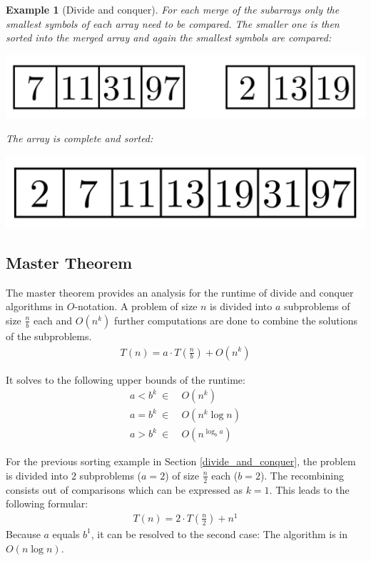 \documentclass[a4paper, 11pt]{article}
\newtheorem*{example*}{Example}
\begin{document}
\begin{example*}[Divide and conquer]
\newpage
For each merge of the subarrays only the smallest symbols of each array need to be compared. The smaller one is then sorted into the merged array and again the smallest symbols are compared:
\begin{center}
\includegraphics[scale=0.125]{images/merge6.png}
\end{center}

The array is complete and sorted:
\begin{center}
\includegraphics[scale=0.125]{images/merge7.png}
\end{center}


\end{example*}


\subsection{Master Theorem}
\label{Master_Theorem}

The master theorem provides an analysis for the runtime of divide and conquer algorithms in $O$-notation. A problem of size $n$ is divided into $a$ subproblems of size $\frac{n}{b}$ each and $O(n^k)$ further computations are done to combine the solutions of the subproblems. \cite{MT}
\begin{align*}
	T(n)=a \cdot T(\frac{n}{b}) + O(n^k)
\end{align*} 

It solves to the following upper bounds of the runtime:
\begin{align}
	a < b^k \ \in & \  O(n^k) \\
	a = b^k \ \in & \  O(n^k \log n) \\
	a > b^k \ \in & \  O(n^{\log_b a})
\end{align} 

For the previous sorting example in Section \ref{divide_and_conquer}, the problem is divided into $2$ subproblems ($a=2$) of size $\frac{n}{2}$ each ($b=2$). The recombining consists out of comparisons which can be expressed as $k=1$. This leads to the following formular:
\begin{align*}
	T(n)=2 \cdot T(\frac{n}{2}) + n^1
\end{align*} 
Because $a$ equals $b^1$, it can be resolved to the second case: The algorithm is in $O(n \log n)$.
\end{document}
